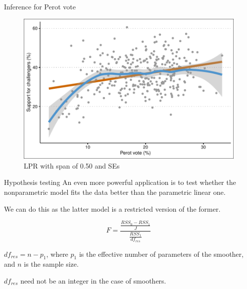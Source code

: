 \documentclass[12pt,english,pdf,xcolor=dvipsnames,aspectratio=169,handout]{beamer}\usepackage[]{graphicx}\usepackage[]{xcolor}
\begin{document}
\begin{frame}{Inference for Perot vote}



\begin{figure}
  \centering
  \includegraphics[scale=0.7]{../04-graphs/04-08}
  \caption{LPR with span of 0.50 and SEs}
\end{figure}
   
\end{frame}



\begin{frame}{Hypothesis testing}
  An even more powerful application is to test whether the nonparametric model fits the data better than the parametric linear one.\bigskip

  We can do this as the latter model is a restricted version of the former.

  \begin{equation}
    F = \frac{\frac{RSS_0 - RSS_1}{J}}{\frac{RSS_1}{df_{res}}}
  \end{equation}

  $df_{res} = n - p_1$, where $p_1$ is the effective number of parameters of the smoother, and $n$ is the sample size.\bigskip

  $df_{res}$ need not be an integer in the case of smoothers.
  
\end{frame}
\end{document}
